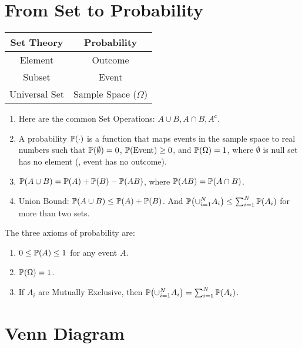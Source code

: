 \section{From Set to Probability}
\begin{table}[H]
    \centering
    \begin{tabular}{|c|c|}
        \hline
        \textbf{Set Theory} & \textbf{Probability} \\
        \hline
        \hline
        Element & Outcome \\
        \hline
        Subset  & Event   \\
        \hline
        Universal Set & Sample Space ($\Omega$) \\
        \hline
    \end{tabular}
\end{table}
\begin{enumerate}
    \item Here are the common Set Operations: $A \cup B, A \cap B, A^{\mathsf{c}}$.
    \item A probability $\P{\cdot}$ is a function that maps events in the sample space to real numbers such that $\P{\emptyset}=0$, $\P{\text{Event}}\geq 0$, and $\P{\Omega}=1$, where $\emptyset$ is null set has no element (\ie, event has no outcome).
    \item $\P{A \cup B} = \P{A}+\P{B}-\P{AB}$, where $\P{AB}=\P{A\cap B}$.
    \item Union Bound: $\P{A\cup B}\leq \P{A}+\P{B}$. And $\P{\cup_{i=1}^N A_i}\leq \sum_{i=1}^{N}\P{A_i}$ for more than two sets.
\end{enumerate}
\begin{axiom}
    The three axioms of probability are:
    \begin{enumerate}
        \item $0\leq \P{A} \leq 1$ for any event $A$.
        \item $\P{\Omega}=1$.
        \item If $A_i$ are Mutually Exclusive, then $\P{\cup_{i=1}^{N}A_i}=\sum_{i=1}^{N}\P{A_i}$.
    \end{enumerate}
\end{axiom}

\section{Venn Diagram}

